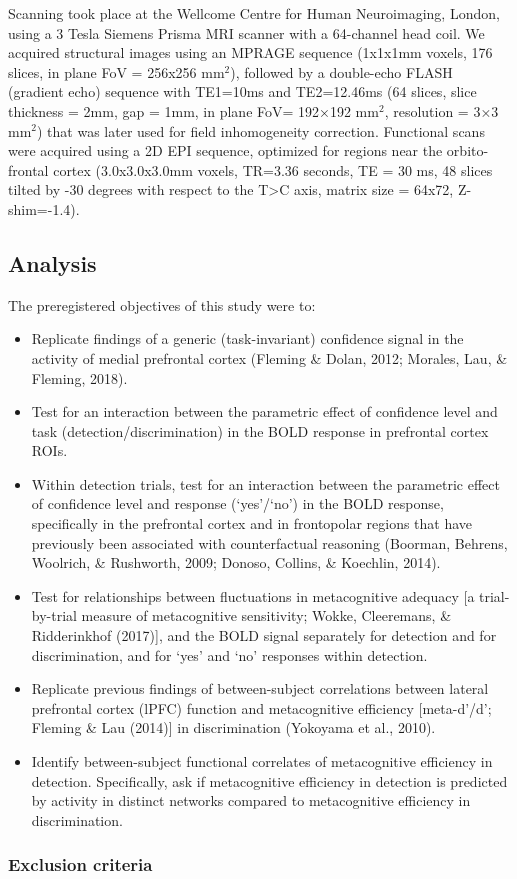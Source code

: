 \documentclass[12pt,twoside]{reedthesis}
\begin{document}
Scanning took place at the Wellcome Centre for Human Neuroimaging, London, using a 3 Tesla Siemens Prisma MRI scanner with a 64-channel head coil.
We acquired structural images using an MPRAGE sequence (1x1x1mm voxels, 176 slices, in plane FoV = 256x256 mm\(^2\)), followed by a double-echo FLASH (gradient echo) sequence with TE1=10ms and TE2=12.46ms (64 slices, slice thickness = 2mm, gap = 1mm, in plane FoV= 192×192 mm\(^2\), resolution = 3×3 mm\(^2\)) that was later used for field inhomogeneity correction. Functional scans were acquired using a 2D EPI sequence, optimized for regions near the orbito-frontal cortex (3.0x3.0x3.0mm voxels, TR=3.36 seconds, TE = 30 ms, 48 slices tilted by -30 degrees with respect to the T\textgreater C axis, matrix size = 64x72, Z-shim=-1.4).

\hypertarget{analysis-1}{%
\subsection{Analysis}\label{analysis-1}}

The preregistered objectives of this study were to:
\begin{itemize}
\item
  Replicate findings of a generic (task-invariant) confidence signal in the activity of medial prefrontal cortex (Fleming \& Dolan, 2012; Morales, Lau, \& Fleming, 2018).
\item
  Test for an interaction between the parametric effect of confidence level and task (detection/discrimination) in the BOLD response in prefrontal cortex ROIs.
\item
  Within detection trials, test for an interaction between the parametric effect of confidence level and response (`yes'/`no') in the BOLD response, specifically in the prefrontal cortex and in frontopolar regions that have previously been associated with counterfactual reasoning (Boorman, Behrens, Woolrich, \& Rushworth, 2009; Donoso, Collins, \& Koechlin, 2014).
\item
  Test for relationships between fluctuations in metacognitive adequacy {[}a trial-by-trial measure of metacognitive sensitivity; Wokke, Cleeremans, \& Ridderinkhof (2017){]}, and the BOLD signal separately for detection and for discrimination, and for `yes' and `no' responses within detection.
\item
  Replicate previous findings of between-subject correlations between lateral prefrontal cortex (lPFC) function and metacognitive efficiency {[}meta-d'/d'; Fleming \& Lau (2014){]} in discrimination (Yokoyama et al., 2010).
\item
  Identify between-subject functional correlates of metacognitive efficiency in detection. Specifically, ask if metacognitive efficiency in detection is predicted by activity in distinct networks compared to metacognitive efficiency in discrimination.
\end{itemize}
\hypertarget{exclusion-criteria}{%
\subsubsection{Exclusion criteria}\label{exclusion-criteria}}
\end{document}
